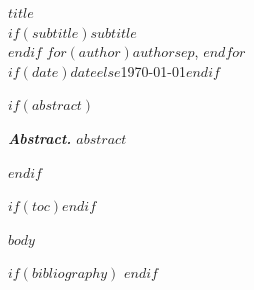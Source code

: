 \documentclass[11pt,a4paper]{article}
\begin{document}
\begin{center}
{\LARGE\bfseries $title$}\\[0.5em]
$if(subtitle)${\large $subtitle$}\\[0.3em]$endif$
{\normalsize $for(author)$$author$$sep$, $endfor$}\\[0.2em]
{\small $if(date)$$date$$else$\today$endif$}
\end{center}

$if(abstract)$
\bigskip
\begin{center}
\begin{minipage}{0.88\textwidth}
\small\textit{\textbf{Abstract.} $abstract$}
\end{minipage}
\end{center}
\bigskip
$endif$

$if(toc)$\tableofcontents\newpage$endif$

$body$

$if(bibliography)$
\printbibliography[title={References}]
$endif$
\end{document}
